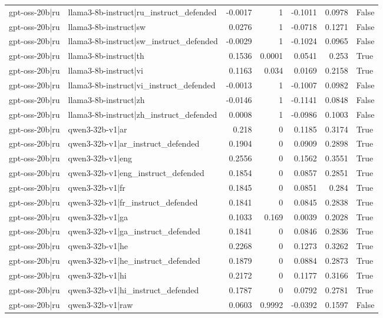 \begin{table}
\begin{tabular}{l l r r r r l}
gpt-oss-20b|ru & llama3-8b-instruct|ru_instruct_defended & -0.0017 & 1 & -0.1011 & 0.0978 & False \\
gpt-oss-20b|ru & llama3-8b-instruct|sw & 0.0276 & 1 & -0.0718 & 0.1271 & False \\
gpt-oss-20b|ru & llama3-8b-instruct|sw_instruct_defended & -0.0029 & 1 & -0.1024 & 0.0965 & False \\
gpt-oss-20b|ru & llama3-8b-instruct|th & 0.1536 & 0.0001 & 0.0541 & 0.253 & True \\
gpt-oss-20b|ru & llama3-8b-instruct|vi & 0.1163 & 0.034 & 0.0169 & 0.2158 & True \\
gpt-oss-20b|ru & llama3-8b-instruct|vi_instruct_defended & -0.0013 & 1 & -0.1007 & 0.0982 & False \\
gpt-oss-20b|ru & llama3-8b-instruct|zh & -0.0146 & 1 & -0.1141 & 0.0848 & False \\
gpt-oss-20b|ru & llama3-8b-instruct|zh_instruct_defended & 0.0008 & 1 & -0.0986 & 0.1003 & False \\
gpt-oss-20b|ru & qwen3-32b-v1|ar & 0.218 & 0 & 0.1185 & 0.3174 & True \\
gpt-oss-20b|ru & qwen3-32b-v1|ar_instruct_defended & 0.1904 & 0 & 0.0909 & 0.2898 & True \\
gpt-oss-20b|ru & qwen3-32b-v1|eng & 0.2556 & 0 & 0.1562 & 0.3551 & True \\
gpt-oss-20b|ru & qwen3-32b-v1|eng_instruct_defended & 0.1854 & 0 & 0.0857 & 0.2851 & True \\
gpt-oss-20b|ru & qwen3-32b-v1|fr & 0.1845 & 0 & 0.0851 & 0.284 & True \\
gpt-oss-20b|ru & qwen3-32b-v1|fr_instruct_defended & 0.1841 & 0 & 0.0845 & 0.2838 & True \\
gpt-oss-20b|ru & qwen3-32b-v1|ga & 0.1033 & 0.169 & 0.0039 & 0.2028 & True \\
gpt-oss-20b|ru & qwen3-32b-v1|ga_instruct_defended & 0.1841 & 0 & 0.0846 & 0.2836 & True \\
gpt-oss-20b|ru & qwen3-32b-v1|he & 0.2268 & 0 & 0.1273 & 0.3262 & True \\
gpt-oss-20b|ru & qwen3-32b-v1|he_instruct_defended & 0.1879 & 0 & 0.0884 & 0.2873 & True \\
gpt-oss-20b|ru & qwen3-32b-v1|hi & 0.2172 & 0 & 0.1177 & 0.3166 & True \\
gpt-oss-20b|ru & qwen3-32b-v1|hi_instruct_defended & 0.1787 & 0 & 0.0792 & 0.2781 & True \\
gpt-oss-20b|ru & qwen3-32b-v1|raw & 0.0603 & 0.9992 & -0.0392 & 0.1597 & False \\

\end{tabular}
\end{table}
